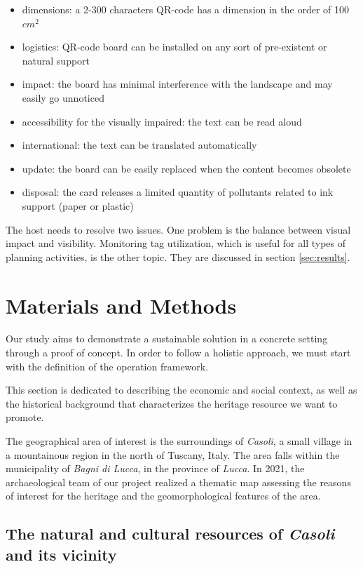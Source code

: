 \documentclass[sustainability,article,submit,pdftex,moreauthors]{Definitions/mdpi}
\begin{document}
\begin{itemize}
	\item dimensions: a 2-300 characters QR-code has a dimension in the order of 100 $cm^2$
	\item logistics: QR-code board can be installed on any sort of pre-existent or natural support
	\item impact: the board has minimal interference with the landscape and may easily go unnoticed
	\item accessibility for the visually impaired: the text can be read aloud
	\item international: the text can be translated automatically
	\item update: the board can be easily replaced when the content becomes obsolete
	\item disposal: the card releases a limited quantity of pollutants related to ink support (paper or plastic)
\end{itemize}
		
The host needs to resolve two issues. One problem is the balance between visual impact and visibility. Monitoring tag utilization, which is useful for all types of planning activities, is the other topic. They are discussed in section \ref{sec:results}.

\section{Materials and Methods}

Our study aims to demonstrate a sustainable solution in a concrete setting through a proof of concept. In order to follow a holistic approach, we must start with the definition of the operation framework.

This section is dedicated to describing the economic and social context, as well as the historical background that characterizes the heritage resource we want to promote.

The geographical area of interest is the surroundings of \emph{Casoli}, a small village in a mountainous region in the north of Tuscany, Italy. The area falls within the municipality of \emph{Bagni di Lucca}, in the province of \emph{Lucca}. In 2021, the archaeological team of our project realized a thematic map assessing the reasons of interest for the heritage and the geomorphological features of the area.

\subsection{The natural and cultural resources of \emph{Casoli} and its vicinity}
\end{document}
